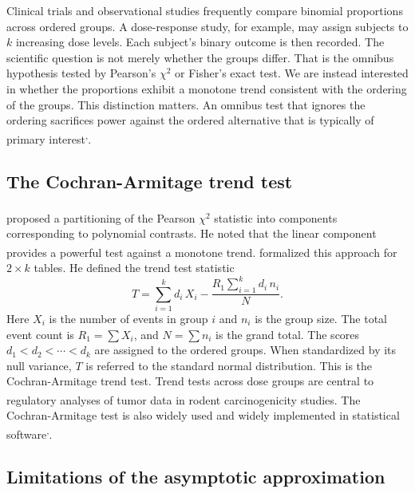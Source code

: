 \documentclass[
  11pt,
]{article}
\begin{document}
Clinical trials and observational studies frequently
compare binomial proportions across ordered groups. A
dose-response study, for example, may assign subjects to
\(k\) increasing dose levels. Each subject's binary outcome
is then recorded. The scientific question is not merely
whether the groups differ. That is the omnibus hypothesis
tested by Pearson's \(\chi^2\) or Fisher's exact test. We
are instead interested in whether the proportions exhibit
a monotone trend consistent with the ordering of the
groups. This distinction matters. An omnibus test that
ignores the ordering sacrifices power against the ordered
alternative that is typically of primary interest\textsuperscript{,}.

\subsection{The Cochran-Armitage trend test}\label{the-cochran-armitage-trend-test}

\textsuperscript{} proposed a partitioning of the
Pearson \(\chi^2\) statistic into components corresponding
to polynomial contrasts. He noted that the linear
component provides a powerful test against a monotone
trend.\textsuperscript{} formalized this approach for
\(2 \times k\) tables. He defined the trend test statistic
\[T = \sum_{i=1}^{k} d_i \, X_i
  - \frac{R_1 \sum_{i=1}^{k} d_i \, n_i}{N}.\]
Here \(X_i\) is the number of events in group \(i\) and \(n_i\)
is the group size. The total event count is
\(R_1 = \sum X_i\), and \(N = \sum n_i\) is the grand total. The scores
\(d_1 < d_2 < \cdots < d_k\) are assigned to the ordered
groups. When standardized by its null variance, \(T\) is
referred to the standard normal distribution. This is
the Cochran-Armitage trend test. Trend tests across dose
groups are central to regulatory analyses of tumor data in
rodent carcinogenicity studies\textsuperscript{}. The
Cochran-Armitage test is also widely used and widely
implemented in statistical software\textsuperscript{,}.

\subsection{Limitations of the asymptotic approximation}\label{limitations-of-the-asymptotic-approximation}
\end{document}

